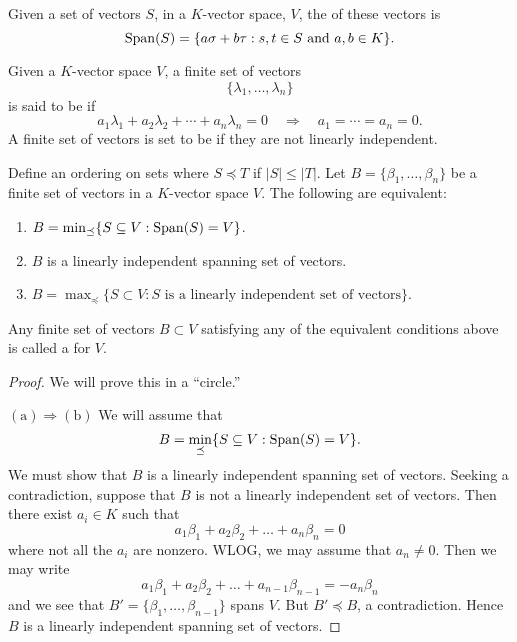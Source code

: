 \documentclass{ximera}
\begin{document}
\begin{definition}
  Given a set of vectors $S$, in a $K$-vector space, $V$, the
   of these vectors is
  \[
  \operatorname{Span}(S) = \{a\sigma+b\tau:\text{$s,t\in S$ and $a,b\in K$}\}.
  \]
\end{definition}


\begin{definition}
  Given a $K$-vector space $V$, a finite set of vectors
  \[
  \{\lambda_1,\dots,\lambda_n\}
  \]
  is said to be  if
  \[
  a_1\lambda_1 + a_2\lambda_2 +\cdots + a_n\lambda_n = 0\quad \Rightarrow \quad a_1= \cdots =a_n = 0.
  \]
  A finite set of vectors is set to be  if
  they are not linearly independent.
\end{definition}

\begin{theorem}
  Define an ordering on sets where $S \preceq T$ if $|S|\le |T|$. Let
  $B= \{\beta_1,\dots,\beta_n\}$ be a finite set of vectors in a
  $K$-vector space $V$. The following are equivalent:
  \begin{enumerate}
  \item $B = \min_{\preceq}\{S\subseteq V:\operatorname{Span}(S) = V\}$.
  \item $B$ is a linearly independent spanning set of vectors.
  \item $B = \max_{\preceq}\{S\subset V:\text{$S$ is a linearly independent set of vectors}\}$.
  \end{enumerate}
  Any finite set of vectors $B \subset V$ satisfying any of the
  equivalent conditions above is called a  for $V$.
  \begin{proof}
    We will prove this in a ``circle.''

    
    $(\mathrm a)\Rightarrow(\mathrm b)$ We will assume that
    \[
    B = \min_{\preceq}\{S\subseteq V:\operatorname{Span}(S) = V\}.
    \]
    We must show that $B$ is a linearly independent spanning set of
    vectors. Seeking a contradiction, suppose that $B$ is not a
    linearly independent set of vectors. Then there exist $a_i\in K$
    such that
    \[
    a_1\beta_1 + a_2\beta_2 + \dots + a_n\beta_n = 0
    \]
    where not all the $a_i$ are nonzero. WLOG, we may assume that $a_n
    \ne 0$. Then we may write
    \[
    a_1\beta_1 + a_2\beta_2 + \dots + a_{n-1}\beta_{n-1}= -a_n \beta_n
    \]
    and we see that $B' = \{\beta_1,\dots,\beta_{n-1}\}$ spans
    $V$. But $B'\preceq B$, a contradiction. Hence $B$ is a linearly
    independent spanning set of vectors.


\end{proof}
\end{theorem}
\end{document}
